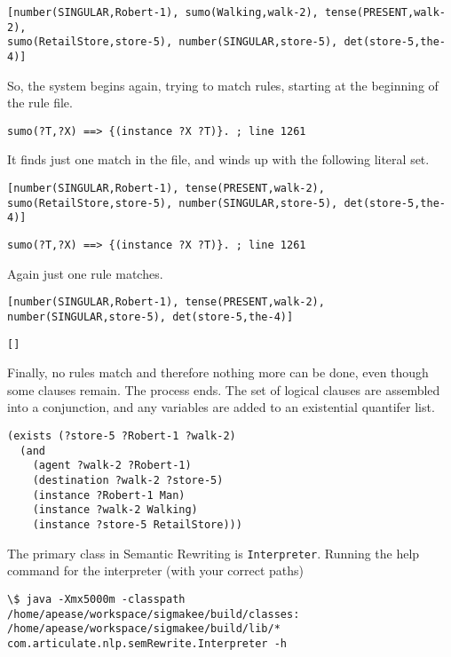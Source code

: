 \documentclass{book}
\begin{document}
\begin{verbatim}
[number(SINGULAR,Robert-1), sumo(Walking,walk-2), tense(PRESENT,walk-2), 
sumo(RetailStore,store-5), number(SINGULAR,store-5), det(store-5,the-4)]
\end{verbatim}

So, the system begins again, trying to match rules, starting at the 
beginning of the rule file.

\begin{verbatim}
sumo(?T,?X) ==> {(instance ?X ?T)}. ; line 1261
\end{verbatim}

It finds just one match in the file, and winds up with the following
literal set.

\begin{verbatim}
[number(SINGULAR,Robert-1), tense(PRESENT,walk-2), 
sumo(RetailStore,store-5), number(SINGULAR,store-5), det(store-5,the-4)]
\end{verbatim}

\begin{verbatim}
sumo(?T,?X) ==> {(instance ?X ?T)}. ; line 1261
\end{verbatim}

Again just one rule matches.

\begin{verbatim}
[number(SINGULAR,Robert-1), tense(PRESENT,walk-2), 
number(SINGULAR,store-5), det(store-5,the-4)]
\end{verbatim}

\begin{verbatim}
[]
\end{verbatim}

Finally, no rules match and therefore nothing more can be done, even 
though some clauses remain.  The process ends.  The set of logical
clauses are assembled into a conjunction, and any variables are added
to an existential quantifer list.

\begin{verbatim}
(exists (?store-5 ?Robert-1 ?walk-2) 
  (and 
    (agent ?walk-2 ?Robert-1)
    (destination ?walk-2 ?store-5)
    (instance ?Robert-1 Man)
    (instance ?walk-2 Walking)
    (instance ?store-5 RetailStore))) 
\end{verbatim}

The primary class in Semantic Rewriting is
\texttt{Interpreter}. Running the help command for
the interpreter (with your correct paths)

\begin{verbatim}
\$ java -Xmx5000m -classpath /home/apease/workspace/sigmakee/build/classes:
/home/apease/workspace/sigmakee/build/lib/*  
com.articulate.nlp.semRewrite.Interpreter -h
\end{verbatim}
\end{document}
